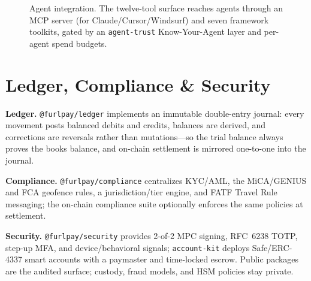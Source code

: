 \documentclass[10pt,twocolumn]{article}
\begin{document}
\begin{figure}[t]
\centering
{}
\caption{Agent integration. The twelve-tool surface reaches agents through an MCP
server (for Claude/Cursor/Windsurf) and seven framework toolkits, gated by an
\texttt{agent-trust} Know-Your-Agent layer and per-agent spend budgets.}
\label{fig:agents}
\end{figure}

\section{Ledger, Compliance \& Security}\label{sec:controls}
\textbf{Ledger.} \texttt{@furlpay/ledger} implements an immutable double-entry
journal: every movement posts balanced debits and credits, balances are derived,
and corrections are reversals rather than mutations---so the trial balance always
proves the books balance, and on-chain settlement is mirrored one-to-one into the
journal.

\textbf{Compliance.} \texttt{@furlpay/compliance} centralizes KYC/AML, the
MiCA/GENIUS and FCA geofence rules, a jurisdiction/tier engine, and FATF Travel
Rule messaging; the on-chain compliance suite optionally enforces the same policies
at settlement.

\textbf{Security.} \texttt{@furlpay/security} provides 2-of-2 MPC signing, RFC~6238
TOTP, step-up MFA, and device/behavioral signals; \texttt{account-kit} deploys
Safe/ERC-4337 smart accounts with a paymaster and time-locked escrow. Public
packages are the audited surface; custody, fraud models, and HSM policies stay
private.
\end{document}
